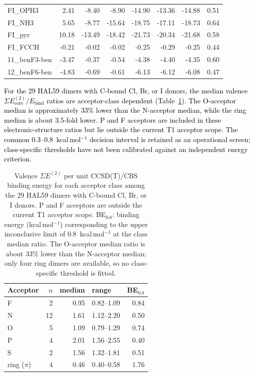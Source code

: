 \documentclass[journal=jcisd8,manuscript=suppinfo]{achemso}
\newcommand{\tcb}[1]{{\textcolor{black}{#1}}}
\begin{document}
\begin{singlespace}
{\begin{longtable}{lrrrrrrr}
FI\_OPH3 & 2.41 & -8.40 & -8.90 & -14.90 & -13.36 & -14.88 & 0.51\\
FI\_NH3 & 5.65 & -8.77 & -15.64 & -18.75 & -17.11 & -18.73 & 0.64\\
FI\_pyr & 10.18 & -13.49 & -18.42 & -21.73 & -20.34 & -21.68 & 0.58\\
FI\_FCCH & -0.21 & -0.02 & -0.02 & -0.25 & -0.29 & -0.25 & 0.44\\
11\_benF3-ben & -3.47 & -0.37 & -0.54 & -4.38 & -4.40 & -4.35 & 0.60\\
12\_benF6-ben & -4.83 & -0.69 & -0.61 & -6.13 & -6.12 & -6.08 & 0.47\\
\end{longtable}}

\tcb{For the 29 HAL59 dimers with C-bound Cl, Br, or I donors, the median valence $\Sigma E^{(2)}_{\mathrm{core}}/E_{\mathrm{bind}}$ ratios are acceptor-class dependent (Table~\ref{tab:classratio}). The O-acceptor median is approximately 33\% lower than the N-acceptor median, while the ring median is about 3.5-fold lower. P and F acceptors are included in these electronic-structure ratios but lie outside the current T1 acceptor scope. The common 0.3--0.8~kcal\,mol$^{-1}$ decision interval is retained as an operational screen; class-specific thresholds have not been calibrated against an independent energy criterion.}

\begin{table}[!htbp]\centering\small
\caption{Valence $\Sigma E^{(2)}$ per unit CCSD(T)/CBS binding energy for each acceptor class among the 29 HAL59 dimers with C-bound Cl, Br, or I donors. P and F acceptors are outside the current T1 acceptor scope. BE$_{0.8}$: binding energy (kcal\,mol$^{-1}$) corresponding to the upper inconclusive limit of 0.8~kcal\,mol$^{-1}$ at the class median ratio. The O-acceptor median ratio is about 33\% lower than the N-acceptor median; only four ring dimers are available, so no class-specific threshold is fitted.}\label{tab:classratio}
\begin{tabular}{lrrlr}\toprule Acceptor & $n$ & median & range & BE$_{0.8}$\\\midrule
F & 2 & 0.95 & 0.82--1.09 & 0.84\\
N & 12 & 1.61 & 1.12--2.20 & 0.50\\
O & 5 & 1.09 & 0.79--1.29 & 0.74\\
P & 4 & 2.01 & 1.56--2.55 & 0.40\\
S & 2 & 1.56 & 1.32--1.81 & 0.51\\
ring ($\pi$) & 4 & 0.46 & 0.40--0.58 & 1.76\\
\bottomrule\end{tabular}\end{table}


\end{singlespace}
\end{document}
